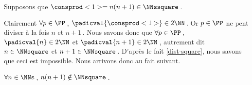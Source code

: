 Supposons que $\consprod<1> = n(n+1) \in \NNssquare$\,.

\medskip

Clairement $\forall p \in \PP$\,, $\padicval{\consprod<1>} \in 2 \NN$\,.
%
Or $p \in \PP$ ne pent diviser à la fois $n$ et $n+1$\,.
%
Nous savons donc que $\forall p \in \PP$\,, 
$\padicval{n} \in 2 \NN$ et $\padicval{n+1} \in 2 \NN$\,,
autrement dit 
$n \in \NNsquare$ et $n + 1 \in \NNsquare$\,.
D'après le fait \ref{dist-square}, nous savons que ceci est impossible.
%
Nous arrivons donc au fait suivant. 

\begin{fact}
	 $\forall n \in \NNs$\,, $n(n+1) \notin \NNsquare$\,.
\end{fact}